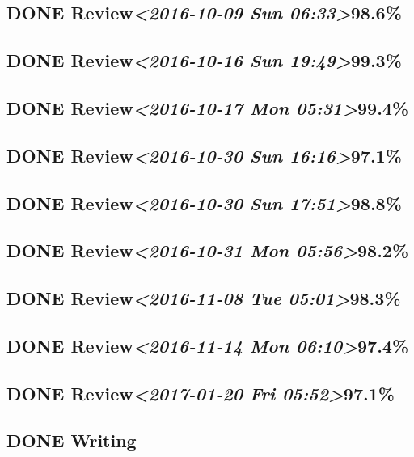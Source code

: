 \documentclass[11pt]{ctexart}
\begin{document}
\subsection{{\bfseries\sffamily DONE} Review\textit{<2016-10-09 Sun 06:33>}98.6\%}
\label{sec:org159748a}
\subsection{{\bfseries\sffamily DONE} Review\textit{<2016-10-16 Sun 19:49>}99.3\%}
\label{sec:org5bafdbc}
\subsection{{\bfseries\sffamily DONE} Review\textit{<2016-10-17 Mon 05:31>}99.4\%}
\label{sec:org4d1ea68}
\subsection{{\bfseries\sffamily DONE} Review\textit{<2016-10-30 Sun 16:16>}97.1\%}
\label{sec:org50f51ed}
\subsection{{\bfseries\sffamily DONE} Review\textit{<2016-10-30 Sun 17:51>}98.8\%}
\label{sec:org3ef7ea9}
\subsection{{\bfseries\sffamily DONE} Review\textit{<2016-10-31 Mon 05:56>}98.2\%}
\label{sec:org76422bb}
\subsection{{\bfseries\sffamily DONE} Review\textit{<2016-11-08 Tue 05:01>}98.3\%}
\label{sec:org5fe4913}
\subsection{{\bfseries\sffamily DONE} Review\textit{<2016-11-14 Mon 06:10>}97.4\%}
\label{sec:orgfb641a7}
\subsection{{\bfseries\sffamily DONE} Review\textit{<2017-01-20 Fri 05:52>}97.1\%}
\label{sec:org7b654fb}
\subsection{{\bfseries\sffamily DONE} Writing}
\label{sec:org1f67c8e}
\end{document}
